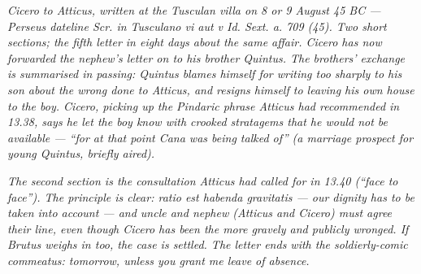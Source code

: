 
\textit{Cicero to Atticus, written at the Tusculan villa on 8 or 9
August 45 BC --- Perseus dateline \textit{Scr. in Tusculano vi
aut v Id. Sext. a. 709 (45)}. Two short sections; the fifth
letter in eight days about the same affair. Cicero has now
forwarded the nephew's letter on to his brother Quintus. The
brothers' exchange is summarised in passing: Quintus blames
himself for writing too sharply to his son about the wrong done
to Atticus, and resigns himself to leaving his own house to the
boy. Cicero, picking up the Pindaric phrase Atticus had
recommended in 13.38, says he let the boy know
\textit{with crooked stratagems} that he would not be available
--- ``for at that point Cana was being talked of'' (a marriage
prospect for young Quintus, briefly aired).}

\textit{The second section is the consultation Atticus had called
for in 13.40 (``face to face''). The principle is clear:
\textit{ratio est habenda gravitatis} --- our dignity has to be
taken into account --- and uncle and nephew (Atticus and Cicero)
must agree their line, even though Cicero has been the more
gravely and publicly wronged. If Brutus weighs in too, the case
is settled. The letter ends with the soldierly-comic
\textit{commeatus}: tomorrow, unless you grant me leave of
absence.}
